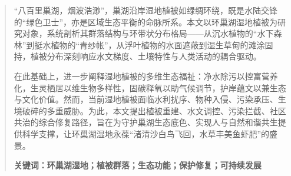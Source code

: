 \begin{abstract}
“八百里巢湖，烟波浩渺”，巢湖沿岸湿地植被如绿绸环绕，既是水陆交锋的“绿色卫士”，亦是区域生态平衡的命脉所系。本文以环巢湖湿地植被为研究对象，系统剖析其群落结构与环带状分布格局——从沉水植物的“水下森林”到挺水植物的“青纱帐”，从浮叶植物的水面遮蔽到湿生草甸的滩涂固持，植被分布深刻响应水文梯度、土壤特性与人类活动的耦合驱动。

在此基础上，进一步阐释湿地植被的多维生态福祉：净水除污以控富营养化，生灵栖居以维生物多样性，固碳释氧以助气候调节，护岸蕴文以兼生态与文化价值。然而，当前湿地植被面临水利扰序、物种入侵、污染承压、生境破碎的多重威胁。为此，本文提出植被重建、水文调控、污染拦截、社区共治的综合修复路径，旨在为守护巢湖生态底色、实现人与自然和谐共生提供科学支撑，让环巢湖湿地永葆“渚清沙白鸟飞回，水草丰美鱼虾肥”的盛景\cite{chu2023,tang2022,liu2022}。

\textbf{关键词：环巢湖湿地；植被群落；生态功能；保护修复；可持续发展}
\end{abstract}
